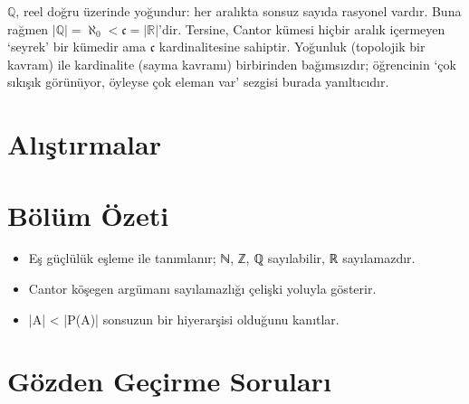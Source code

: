 \begin{yanilgi}
$\mathbb Q$, reel doğru üzerinde yoğundur: her aralıkta sonsuz sayıda rasyonel vardır. Buna rağmen $|\mathbb Q|=\aleph_0<\mathfrak c=|\mathbb R|$’dir. Tersine, Cantor kümesi hiçbir aralık içermeyen ‘seyrek’ bir kümedir ama $\mathfrak c$ kardinalitesine sahiptir. Yoğunluk (topolojik bir kavram) ile kardinalite (sayma kavramı) birbirinden bağımsızdır; öğrencinin ‘çok sıkışık görünüyor, öyleyse çok eleman var’ sezgisi burada yanıltıcıdır.
\end{yanilgi}

\section*{Alıştırmalar}






\section*{Bölüm Özeti}

\begin{itemize}\setlength{\itemsep}{2pt}\setlength{\parskip}{0pt}
\item Eş güçlülük eşleme ile tanımlanır; ℕ, ℤ, ℚ sayılabilir, ℝ sayılamazdır.
\item Cantor köşegen argümanı sayılamazlığı çelişki yoluyla gösterir.
\item |A| < |P(A)| sonsuzun bir hiyerarşisi olduğunu kanıtlar.
\end{itemize}

\section*{Gözden Geçirme Soruları}

